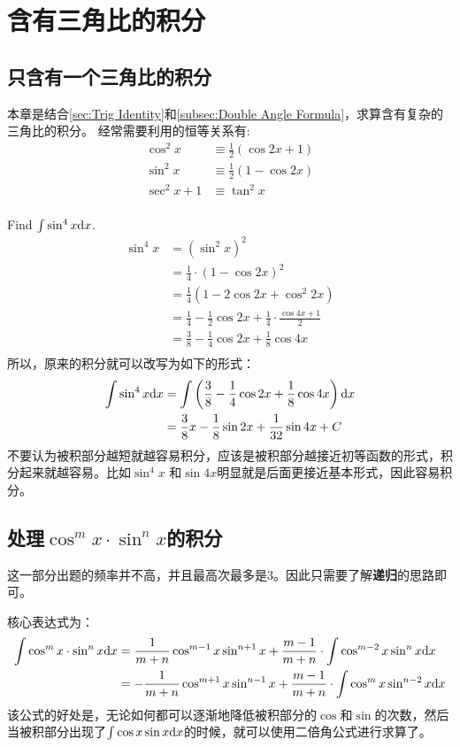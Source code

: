 \section{含有三角比的积分}
\subsection*{只含有一个三角比的积分}
本章是结合\ref{sec:Trig Identity}和\ref{subsec:Double Angle Formula}，求算含有复杂的三角比的积分。
经常需要利用的恒等关系有:
\begin{align*}
\cos^2 x &\equiv \frac{1}{2}(\cos 2x +1)\\
\sin^2 x &\equiv \frac{1}{2}(1-\cos 2x)\\
\sec^2 x+1 &\equiv \tan^2 x\\
\end{align*}

\begin{ExampleBox}
 Find $\int \sin^4 x{\mathrm{d}} x$. 
\tcblower
 \begin{align*}
  \sin^4 x &=\left( \sin^2 x\right)^2 \\
           &=\frac{1}{4}\cdot (1-\cos 2x)^2\\
           &=\frac{1}{4}(1-2\cos 2x+\cos^2 2x)\\
           &=\frac{1}{4}-\frac{1}{2} \cos 2x +\frac{1}{4}\cdot \frac{\cos 4x+1}{2}\\
           &=\frac{3}{8}-\frac{1}{4}\cos 2x +\frac{1}{8} \cos 4x\\
 \end{align*}
所以，原来的积分就可以改写为如下的形式：
\begin{align*}
 \int \sin^4 x{\mathrm{d}} x &=\int \left( \frac{3}{8}-\frac{1}{4}\cos 2x +\frac{1}{8} \cos 4x\right) {\mathrm{d}} x\\
                  &= \frac{3}{8}x-\frac{1}{8}\sin 2x+\frac{1}{32}\sin 4x +C
\end{align*}
不要认为被积部分越短就越容易积分，应该是被积部分越接近初等函数的形式，积分起来就越容易。比如$\sin^4 x$ 和$\sin 4x$明显就是后面更接近基本形式，因此容易积分。
\end{ExampleBox}


\subsection*{处理$\cos^m x \cdot \sin^n x$的积分}
这一部分出题的频率并不高，并且最高次最多是3。因此只需要了解\textbf{递归}的思路即可。

核心表达式为：
\begin{align*}
  \int \cos^m x \cdot \sin^n x {\mathrm{d}} x &= \frac{1}{m+n}\cos^{m-1}x \sin^{n+1} x+\frac{m-1}{m+n}\cdot\int \cos^{m-2} x \sin^n x {\mathrm{d}} x\\
  &=-\frac{1}{m+n}\cos^{m+1}x \sin^{n-1} x+\frac{m-1}{m+n}\cdot\int \cos^{m} x \sin^{n-2} x {\mathrm{d}} x
\end{align*}
该公式的好处是，无论如何都可以逐渐地降低被积部分的$\cos$和$\sin$的次数，然后当被积部分出现了$\int \cos x \sin x {\mathrm{d}} x$的时候，就可以使用二倍角公式进行求算了。
\clearpage

